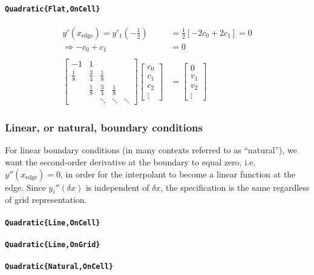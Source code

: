\documentclass{article}
\begin{document}
\paragraph{\texttt{Quadratic\{Flat,OnCell\}}}
\begin{align*}
y'(x_{\text{edge}}) = y'_1\left(-\frac{1}{2}\right) &= \frac{1}{2}\left[-2c_0 + 2c_1\right] = 0\\
\Rightarrow -c_0 + c_1 &= 0
\\
\\
\begin{bmatrix}
-1 & 1 \\
\frac{1}{8} & \frac{3}{4} & \frac{1}{8} \\
 & \frac{1}{8} & \frac{3}{4} & \frac{1}{8} \\
 & & \ddots & \ddots & \ddots
\end{bmatrix}
\begin{bmatrix}c_0\\ c_1\\ c_2\\\vdots\end{bmatrix}
&=
\begin{bmatrix}0\\ v_1 \\ v_2 \\\vdots\end{bmatrix}
\end{align*}

\subsubsection{Linear, or natural, boundary conditions}

For linear boundary conditions (in many contexts referred to as ``natural''), we want the second-order derivative at the boundary to equal zero, i.e. $y''(x_{\text{edge}}) = 0$, in order for the interpolant to become a linear function at the edge. Since $y_i''(\delta x)$ is independent of $\delta x$, the specification is the same regardless of grid representation.

\paragraph{\texttt{Quadratic\{Line,OnCell\}}}
\paragraph{\texttt{Quadratic\{Line,OnGrid\}}}
\paragraph{\texttt{Quadratic\{Natural,OnCell\}}}
\end{document}
